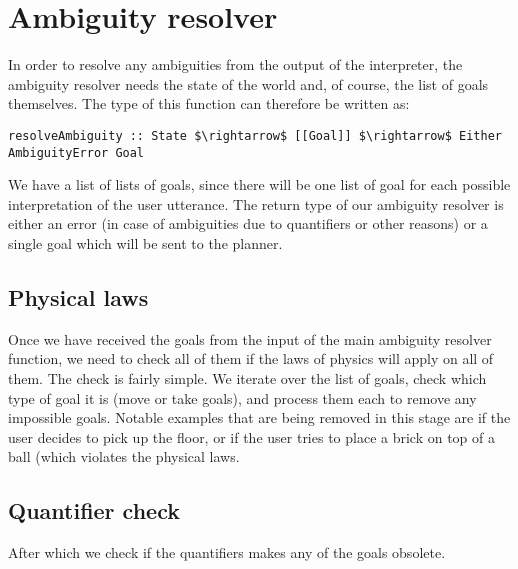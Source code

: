 
\section*{Ambiguity resolver}
In order to resolve any ambiguities from the output of the interpreter, the ambiguity resolver needs the state of the world and, of course, the list of goals themselves.
The type of this function can therefore be written as:
\begin{lstlisting}
resolveAmbiguity :: State $\rightarrow$ [[Goal]] $\rightarrow$ Either AmbiguityError Goal
\end{lstlisting}

We have a list of lists of goals, since there will be one list of goal for each possible interpretation of the user utterance.
The return type of our ambiguity resolver is either an error (in case of ambiguities due to quantifiers or other reasons) or a single goal which will be sent to the planner.

\subsection*{Physical laws}
Once we have received the goals from the input of the main ambiguity resolver function, we need to check all of them if the laws of physics will apply on all of them.
The check is fairly simple.
We iterate over the list of goals, check which type of goal it is (move or take goals), and process them each to remove any impossible goals.
Notable examples that are being removed in this stage are if the user decides to pick up the floor, or if the user tries to place a brick on top of a ball (which violates the physical laws.

\subsection*{Quantifier check}
After which we check if the quantifiers makes any of the goals obsolete. %


